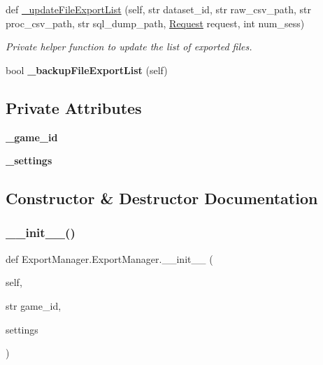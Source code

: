 \begin{DoxyCompactItemize}
def \mbox{\hyperlink{class_export_manager_1_1_export_manager_a176e2763b0bb0c9628333b0f25697b60}{\+\_\+update\+File\+Export\+List}} (self, str dataset\+\_\+id, str raw\+\_\+csv\+\_\+path, str proc\+\_\+csv\+\_\+path, str sql\+\_\+dump\+\_\+path, \mbox{\hyperlink{class_request_1_1_request}{Request}} request, int num\+\_\+sess)
\begin{DoxyCompactList}\small\item\em Private helper function to update the list of exported files. \end{DoxyCompactList}\item 
\mbox{\label{class_export_manager_1_1_export_manager_a98462fae1506014ad2b80e7508299a9b}} 
bool {\bfseries \+\_\+backup\+File\+Export\+List} (self)
\end{DoxyCompactItemize}
\subsection*{Private Attributes}
\begin{DoxyCompactItemize}
\item 
\mbox{\label{class_export_manager_1_1_export_manager_a8bbf6a14b4746b796f1b0314cd131ff0}} 
{\bfseries \+\_\+game\+\_\+id}
\item 
\mbox{\label{class_export_manager_1_1_export_manager_a60c871b4e8f2e111dbdf7c8ee3aa59bf}} 
{\bfseries \+\_\+settings}
\end{DoxyCompactItemize}


\subsection{Constructor \& Destructor Documentation}
\mbox{\label{class_export_manager_1_1_export_manager_a2ddaa723d56840548afddbaf89cc8b3d}} 
\subsubsection{\texorpdfstring{\_\_init\_\_()}{\_\_init\_\_()}}
{\footnotesize\ttfamily def Export\+Manager.\+Export\+Manager.\+\_\+\+\_\+init\+\_\+\+\_\+ (\begin{DoxyParamCaption}\item[{}]{self,  }\item[{str}]{game\+\_\+id,  }\item[{}]{settings }\end{DoxyParamCaption})}



